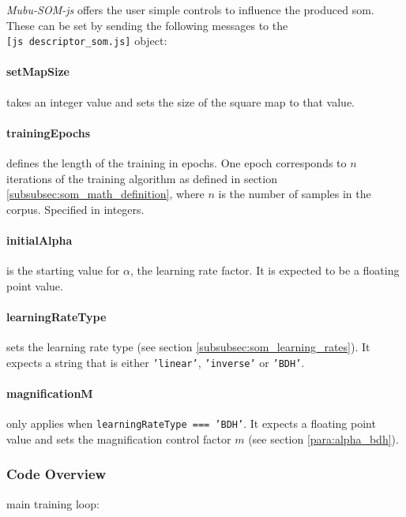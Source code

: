 \textit{Mubu-SOM-js} offers the user simple controls to influence the produced
\gls{som}. These can be set by sending the following messages to the \\
\texttt{[js descriptor\_som.js]} object:


\paragraph*{setMapSize} takes an integer value and sets the size of the square
map to that value.

\paragraph*{trainingEpochs} defines the length of the
training in epochs. One epoch corresponds to $n$ iterations of the training
algorithm as defined in section \ref{subsubsec:som_math_definition}, where $n$
is the number of samples in the corpus. Specified in integers.

\paragraph*{initialAlpha} is the starting value for $\alpha$, the learning rate
factor. It is expected to be a floating point value.

\paragraph*{learningRateType} sets the learning rate type (see section
\ref{subsubsec:som_learning_rates}). It expects a string that is either
\texttt{'linear'}, \texttt{'inverse'} or \texttt{'BDH'}.

\paragraph*{magnificationM} only applies when
\texttt{learningRateType === 'BDH'}. It expects a floating point value
and sets the magnification control factor $m$ (see section
\ref{para:alpha_bdh}).

\subsubsection{Code Overview}
\label{subsubsec:mubu-som_overview}

main training loop:

